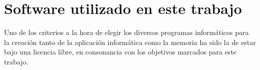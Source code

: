 \chapter{Software utilizado en este trabajo}

Uno de los criterios a la hora de elegir los diversos programas informáticos para la creación tanto de la aplicación informática como la memoria ha sido la de estar bajo una licencia libre, en consonancia con los objetivos marcados para este trabajo. 